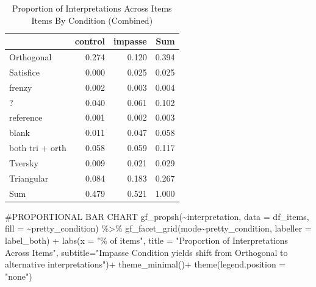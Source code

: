 \documentclass[
  letterpaper,
  DIV=11,
  numbers=noendperiod]{scrreprt}
\newenvironment{Shaded}{\begin{snugshade}}{\end{snugshade}}
\newcommand{\AttributeTok}[1]{\textcolor[rgb]{0.40,0.45,0.13}{#1}}
\newcommand{\CommentTok}[1]{\textcolor[rgb]{0.37,0.37,0.37}{#1}}
\newcommand{\FunctionTok}[1]{\textcolor[rgb]{0.28,0.35,0.67}{#1}}
\newcommand{\NormalTok}[1]{\textcolor[rgb]{0.00,0.23,0.31}{#1}}
\newcommand{\SpecialCharTok}[1]{\textcolor[rgb]{0.37,0.37,0.37}{#1}}
\newcommand{\StringTok}[1]{\textcolor[rgb]{0.13,0.47,0.30}{#1}}
\begin{document}
\begin{table}

\caption{Proportion of Interpretations Across Items Items By Condition (Combined)}
\centering
\begin{tabular}[t]{l|r|r|r}
\hline
  & control & impasse & Sum\\
\hline
Orthogonal & 0.274 & 0.120 & 0.394\\
\hline
Satisfice & 0.000 & 0.025 & 0.025\\
\hline
frenzy & 0.002 & 0.003 & 0.004\\
\hline
? & 0.040 & 0.061 & 0.102\\
\hline
reference & 0.001 & 0.002 & 0.003\\
\hline
blank & 0.011 & 0.047 & 0.058\\
\hline
both tri + orth & 0.058 & 0.059 & 0.117\\
\hline
Tversky & 0.009 & 0.021 & 0.029\\
\hline
Triangular & 0.084 & 0.183 & 0.267\\
\hline
Sum & 0.479 & 0.521 & 1.000\\
\hline
\end{tabular}
\end{table}

\begin{Shaded}
\begin{Highlighting}[]
\CommentTok{\#PROPORTIONAL BAR CHART}
\FunctionTok{gf\_propsh}\NormalTok{(}\SpecialCharTok{\textasciitilde{}}\NormalTok{interpretation, }\AttributeTok{data =}\NormalTok{ df\_items, }\AttributeTok{fill =} \SpecialCharTok{\textasciitilde{}}\NormalTok{pretty\_condition) }\SpecialCharTok{\%\textgreater{}\%} 
  \FunctionTok{gf\_facet\_grid}\NormalTok{(mode}\SpecialCharTok{\textasciitilde{}}\NormalTok{pretty\_condition, }\AttributeTok{labeller =}\NormalTok{ label\_both) }\SpecialCharTok{+}
  \FunctionTok{labs}\NormalTok{(}\AttributeTok{x =} \StringTok{"\% of items"}\NormalTok{,}
       \AttributeTok{title =} \StringTok{"Proportion of Interpretations Across Items"}\NormalTok{,}
       \AttributeTok{subtitle=}\StringTok{"Impasse Condition yields shift from Orthogonal to alternative interpretations"}\NormalTok{)}\SpecialCharTok{+}
  \FunctionTok{theme\_minimal}\NormalTok{()}\SpecialCharTok{+} \FunctionTok{theme}\NormalTok{(}\AttributeTok{legend.position =} \StringTok{"none"}\NormalTok{)}
\end{Highlighting}
\end{Shaded}
\end{document}
